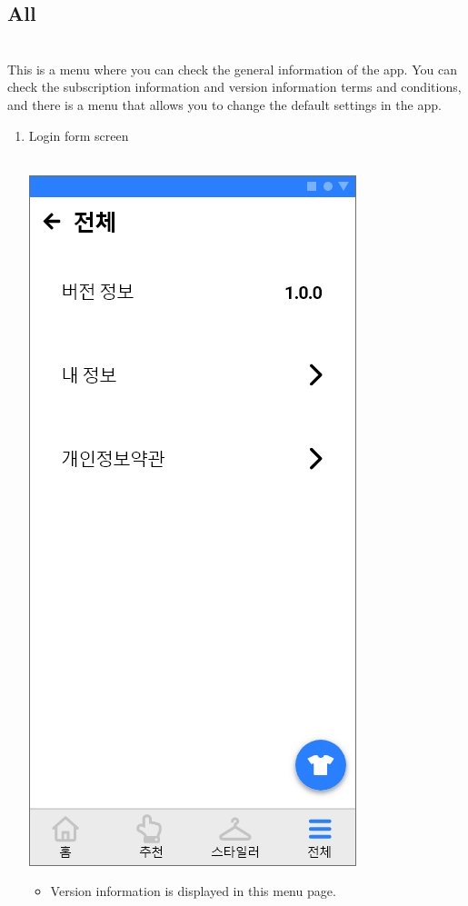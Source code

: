 \documentclass[conference]{IEEEtran}
\begin{document}
\subsection {All} \\
This is a menu where you can check the general information of the app. You can check the subscription information and version information terms and conditions, and there is a menu that allows you to change the default settings in the app.
\begin{enumerate}
    \item Login form screen \\ \\
    \centerline{\includegraphics[scale=0.32]{assets/전체.jpg}}
    \begin{itemize}
    \item[] Version information is displayed in this menu page. \\

\end{itemize}
\end{enumerate}
\end{document}
